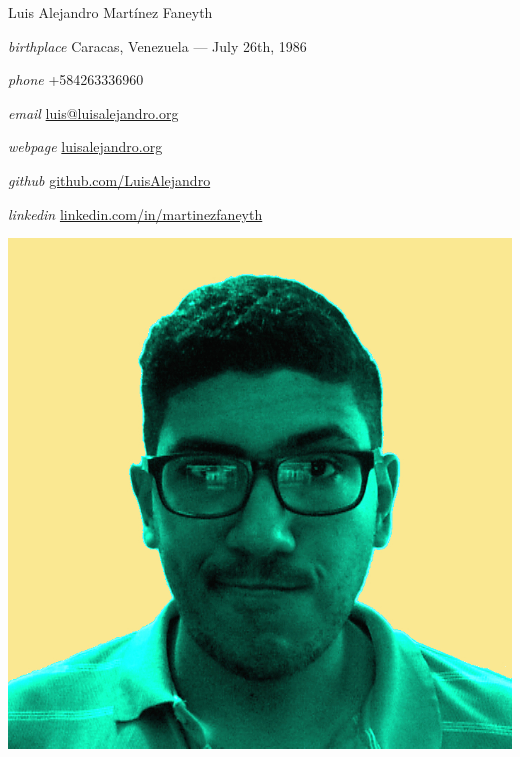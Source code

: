 \documentclass[10pt,letterpaper]{article}
\begin{document}
\begin{cv}{Luis Alejandro Mart\'inez Faneyth}
\vspace{1em}

\begin{minipage}{.7\linewidth}
\begin{cvlist}{}
\item[\textit{\large{birthplace}}]{Caracas, Venezuela --- July 26th, 1986}
\item[\textit{\large{phone}}]{+584263336960}
\item[\textit{\large{email}}]{\href{mailto:luis@luisalejandro.org}{luis@luisalejandro.org}}
\item[\textit{\large{webpage}}]{\href{http://luisalejandro.org}{luisalejandro.org}}
\item[\textit{\large{github}}]{\href{http://github.com/LuisAlejandro}{github.com/LuisAlejandro}}
\item[\textit{\large{linkedin}}]{\href{https://www.linkedin.com/in/martinezfaneyth}{linkedin.com/in/martinezfaneyth}}
\end{cvlist}
\end{minipage}
\begin{minipage}{.3\linewidth}
\includegraphics[scale=0.15]{curriculumvitae.jpg}
\end{minipage}
\vspace{1em}


\end{cv}
\end{document}
